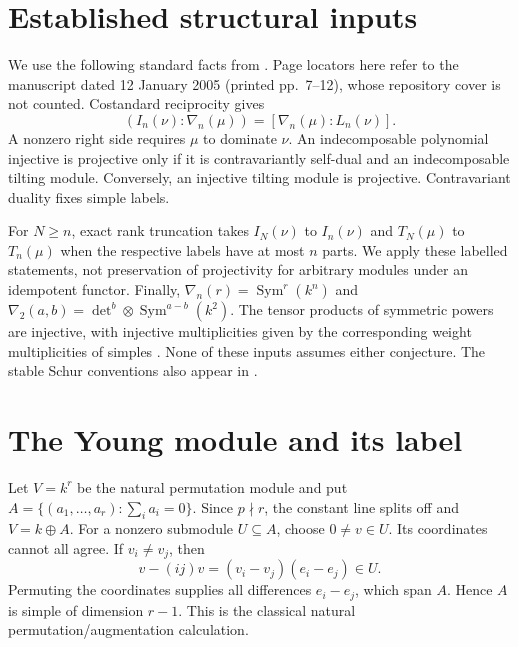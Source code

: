 \documentclass[11pt]{article}
\newcommand{\Sym}{\operatorname{Sym}}
\begin{document}
\section{Established structural inputs}
We use the following standard facts from \cite[Sections~2.2--2.4 and~3]{DD}.
Page locators here refer to the manuscript dated 12 January 2005
(printed pp.~7--12), whose repository cover is not counted.
Costandard reciprocity gives
\begin{equation}\label{reciprocity}
 (I_n(\nu):\nabla_n(\mu))=[\nabla_n(\mu):L_n(\nu)].
\end{equation}
A nonzero right side requires \(\mu\) to dominate \(\nu\).
An indecomposable polynomial injective is projective only if it is
contravariantly self-dual and an indecomposable tilting module.
Conversely, an injective tilting module is projective.
Contravariant duality fixes simple labels.

For \(N\ge n\), exact rank truncation takes \(I_N(\nu)\) to \(I_n(\nu)\)
and \(T_N(\mu)\) to \(T_n(\mu)\) when the respective labels have at most
\(n\) parts. We apply these labelled statements, not preservation of
projectivity for arbitrary modules under an idempotent functor.
Finally, \(\nabla_n(r)=\Sym^r(k^n)\) and
\(\nabla_2(a,b)=\det^b\otimes\Sym^{a-b}(k^2)\).
The tensor products of symmetric powers are injective, with injective
multiplicities given by the corresponding weight multiplicities of simples
\cite[Section~3, printed p.~12]{DD}.
None of these inputs assumes either conjecture. The stable Schur conventions
also appear in \cite[printed p.~3]{CP}.

\section{The Young module and its label}
Let \(V=k^r\) be the natural permutation module and put
\(A=\{(a_1,\ldots,a_r):\sum_i a_i=0\}\).
Since \(p\nmid r\), the constant line splits off and \(V=k\oplus A\).
For a nonzero submodule \(U\subseteq A\), choose \(0\ne v\in U\).
Its coordinates cannot all agree. If \(v_i\ne v_j\), then
\[
 v-(ij)v=(v_i-v_j)(e_i-e_j)\in U.
\]
Permuting the coordinates supplies all differences \(e_i-e_j\), which span
\(A\). Hence \(A\) is simple of dimension \(r-1\).
This is the classical natural permutation/augmentation calculation.
\end{document}
